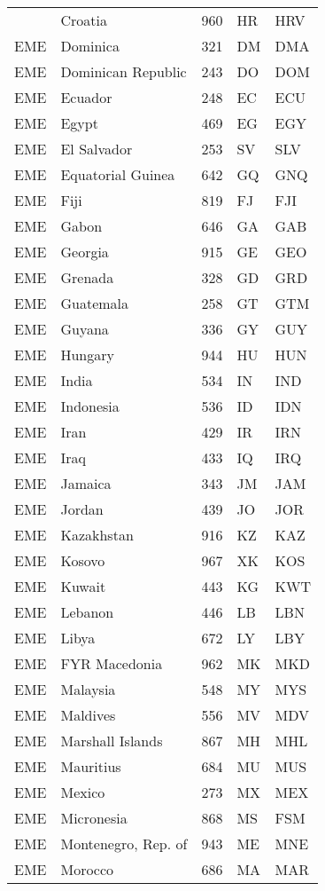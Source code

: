 \documentclass[12pt,a4paper,oldfontcommands]{memoir}
\begin{document}
\begin{table}
\begin{threeparttable}
\begin{tabular}
{EME} & Croatia & 960 & HR & HRV \\
{EME} & Dominica & 321 & DM & DMA \\
{EME} & Dominican Republic & 243 & DO & DOM \\
{EME} & Ecuador & 248 & EC & ECU \\
{EME} & Egypt & 469 & EG & EGY \\
{EME} & El Salvador & 253 & SV & SLV \\
{EME} & Equatorial Guinea & 642 & GQ & GNQ \\
{EME} & Fiji & 819 & FJ & FJI \\
{EME} & Gabon & 646 & GA & GAB \\
{EME} & Georgia & 915 & GE & GEO \\
{EME} & Grenada & 328 & GD & GRD \\
{EME} & Guatemala & 258 & GT & GTM \\
{EME} & Guyana & 336 & GY & GUY \\
{EME} & Hungary & 944 & HU & HUN \\
{EME} & India & 534 & IN & IND \\
{EME} & Indonesia & 536 & ID & IDN \\
{EME} & Iran & 429 & IR & IRN \\
{EME} & Iraq & 433 & IQ & IRQ \\
{EME} & Jamaica & 343 & JM & JAM \\
{EME} & Jordan & 439 & JO & JOR \\
{EME} & Kazakhstan & 916 & KZ & KAZ \\
{EME} & Kosovo & 967 & XK & KOS \\
{EME} & Kuwait & 443 & KG & KWT \\
{EME} & Lebanon & 446 & LB & LBN \\
{EME} & Libya & 672 & LY & LBY \\
{EME} & FYR Macedonia & 962 & MK & MKD \\
{EME} & Malaysia & 548 & MY & MYS \\
{EME} & Maldives & 556 & MV & MDV \\
{EME} & Marshall Islands & 867 & MH & MHL \\
{EME} & Mauritius & 684 & MU & MUS \\
{EME} & Mexico & 273 & MX & MEX \\
{EME} & Micronesia & 868 & MS & FSM \\
{EME} & Montenegro, Rep. of & 943 & ME & MNE \\
{EME} & Morocco & 686 & MA & MAR \\

\end{tabular}
\end{threeparttable}
\end{table}
\end{document}
